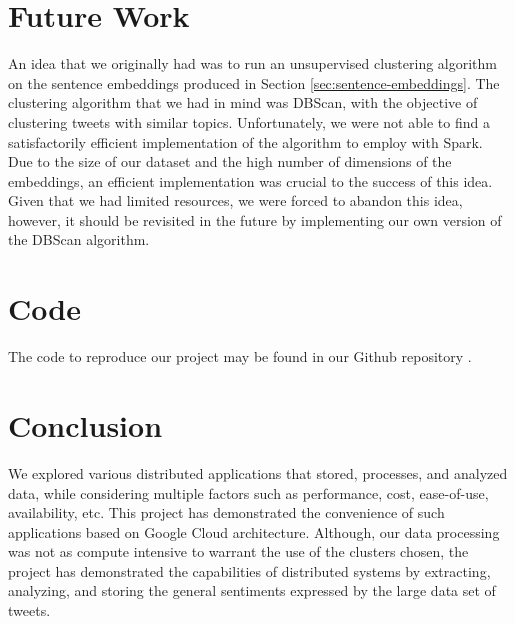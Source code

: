 \documentclass[a4paper,12pt]{article}
\begin{document}
\section{Future Work}

An idea that we originally had was to run an unsupervised clustering algorithm on the sentence embeddings produced in Section \ref{sec:sentence-embeddings}. The clustering algorithm that we had in mind was DBScan\cite{Ester96adensity-based}, with the objective of clustering tweets with similar topics. Unfortunately, we were not able to find a satisfactorily efficient implementation of the algorithm to employ with Spark. Due to the size of our dataset and the high number of dimensions of the embeddings, an efficient implementation was crucial to the success of this idea. Given that we had limited resources, we were forced to abandon this idea, however, it should be revisited in the future by implementing our own version of the DBScan algorithm.

\section{Code}

The code to reproduce our project may be found in our Github repository \cite{Githubrepository}.

\section{Conclusion}

We explored various distributed applications that stored, processes, and analyzed data, while considering multiple
factors such as performance, cost, ease-of-use, availability, etc. This project has demonstrated the convenience
of such applications based on Google Cloud architecture. Although, our data processing was not as compute intensive
to warrant the use of the clusters chosen, the project has demonstrated the capabilities of distributed systems by
extracting, analyzing, and storing the general sentiments expressed by the large data set of tweets.

\nocite{*}



\end{document}
